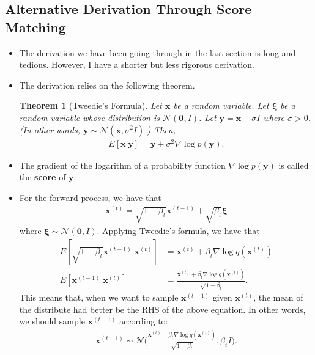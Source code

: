 \documentclass[10pt]{article}
\newtheorem{theorem}[lemma]{Theorem}
\newcommand{\ve}[1]{\mathbf{#1}}
\newcommand{\ves}[1]{\boldsymbol{#1}}
\newcommand{\mcal}[1]{\mathcal{#1}}
\begin{document}
\subsection{Alternative Derivation Through Score Matching}

\begin{itemize}
  \item The derivation we have been going through in the last section is long and tedious. However, I have a shorter but less rigorous derivation.
  
  \item The derivation relies on the following theorem.
  \begin{theorem}[Tweedie's Formula]
    Let $\ve{x}$ be a random variable. Let $\ves{\xi}$ be a random variable whose distribution is $\mcal{N}(\ve{0}, I)$. Let $\ve{y} = \ve{x} + \sigma I$ where $\sigma > 0$. (In other words, $\ve{y} \sim \mcal{N}(\ve{x}, \sigma^2 I)$.) Then,
    \begin{align*}
      E[\ve{x}|\ve{y}] = \ve{y} + \sigma^2 \nabla \log p(\ve{y}).
    \end{align*}
  \end{theorem}

  \item The gradient of the logarithm of a probability function $\nabla \log p(\ve{y})$ is called the {\bf score} of $\ve{y}$.
  
  \item For the forward process, we have that
  \begin{align*}
    \ve{x}^{(t)} = \sqrt{1 - \beta_t} \ve{x}^{(t-1)} + \sqrt{\beta_t} \ves{\xi}
  \end{align*}
  where $\ves{\xi} \sim \mcal{N}(\ve{0},I)$. Applying Tweedie's formula, we have that
  \begin{align*}
    E[\sqrt{1 - \beta_t} \ve{x}^{(t-1)} | \ve{x}^{(t)}] 
    &= \ve{x}^{(t)} + \beta_t \nabla \log q(\ve{x}^{(t)}) \\
    E[\ve{x}^{(t-1)} | \ve{x}^{(t)}] 
    &= \frac{\ve{x}^{(t)} + \beta_t \nabla \log q(\ve{x}^{(t)})}{\sqrt{1 - \beta_t}}.
  \end{align*}
  This means that, when we want to sample $\ve{x}^{(t-1)}$ given $\ve{x}^{(t)}$, the mean of the distribute had better be the RHS of the above equation. In other words, we should sample $\ve{x}^{(t-1)}$ according to:
  \begin{align*}
    \ve{x}^{(t-1)} \sim  \mcal{N}\bigg(\frac{\ve{x}^{(t)} + \beta_t \nabla \log q(\ve{x}^{(t)})}{\sqrt{1 - \beta_t}}, \beta_t I \bigg).
  \end{align*}


\end{itemize}
\end{document}
